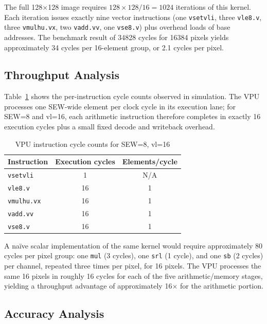 The full 128$\times$128 image requires $128 \times 128 / 16 = 1024$ iterations of
this kernel. Each iteration issues exactly nine vector instructions (one
\texttt{vsetvli}, three \texttt{vle8.v}, three \texttt{vmulhu.vx}, two \texttt{vadd.vv},
one \texttt{vse8.v}) plus overhead loads of base addresses. The benchmark result of
34828 cycles for 16384 pixels yields approximately 34 cycles per 16-element group, or
2.1 cycles per pixel.

\subsection{Throughput Analysis}

Table~\ref{tab:vpu_throughput} shows the per-instruction cycle counts observed in
simulation. The VPU processes one SEW-wide element per clock cycle in its execution
lane; for SEW=8 and vl=16, each arithmetic instruction therefore completes in exactly
16 execution cycles plus a small fixed decode and writeback overhead.

\begin{table}[H]
  \centering
  \caption{VPU instruction cycle counts for SEW=8, vl=16}
  \label{tab:vpu_throughput}
  \begin{tabular}{lcc}
    \toprule
    \textbf{Instruction} & \textbf{Execution cycles} & \textbf{Elements/cycle} \\
    \midrule
    \texttt{vsetvli}   & 1  & N/A \\
    \texttt{vle8.v}    & 16 & 1 \\
    \texttt{vmulhu.vx} & 16 & 1 \\
    \texttt{vadd.vv}   & 16 & 1 \\
    \texttt{vse8.v}    & 16 & 1 \\
    \bottomrule
  \end{tabular}
\end{table}

A na\"ive scalar implementation of the same kernel would require approximately 80 cycles
per pixel group: one \texttt{mul} (3 cycles), one \texttt{srl} (1 cycle), and one
\texttt{sb} (2 cycles) per channel, repeated three times per pixel, for 16 pixels.
The VPU processes the same 16 pixels in roughly 16 cycles for each of the five
arithmetic/memory stages, yielding a throughput advantage of approximately 16$\times$
for the arithmetic portion.

\subsection{Accuracy Analysis}

